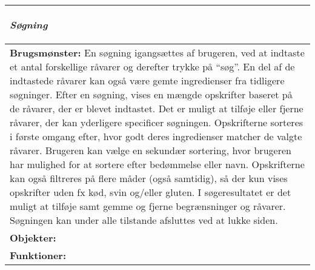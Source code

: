 \begin{tabular}{p{\textwidth}}
    \hline
    \begin{center} 
    \textbf{\textit{Søgning}} 
    \end{center} \\ \hline
    \textbf{Brugsmønster:} En søgning igangsættes af brugeren, ved at indtaste et antal forskellige råvarer og derefter trykke på “søg”. En del af de indtastede råvarer kan også være gemte ingredienser fra tidligere søgninger. Efter en søgning, vises en mængde opskrifter baseret på de råvarer, der er blevet indtastet. Det er muligt at tilføje eller fjerne råvarer, der kan yderligere specificer søgningen.  Opskrifterne sorteres i første omgang efter, hvor godt deres ingredienser matcher de valgte råvarer. Brugeren kan vælge en sekundær sortering, hvor brugeren har mulighed for at sortere efter bedømmelse eller navn. Opskrifterne kan også filtreres på flere måder (også samtidig), så der kun vises opskrifter uden fx kød, svin og/eller gluten. I søgeresultatet er det muligt at tilføje samt gemme og fjerne begrænsninger og råvarer. Søgningen kan under alle tilstande afsluttes ved at lukke siden. \\
    \textbf{Objekter:}  \\
    \textbf{Funktioner:}  \\ \hline
\end{tabular}